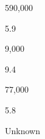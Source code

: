 \begin{description}[font=\normalfont,style=nextline]
\begin{multicols}{2}
\begin{description}[font=\normalfont\itshape,noitemsep]
\item[\nativespeakers] 590,000 
 \item[\region] \regionMexico 
 \end{description}\end{multicols}
\item[\langnameUlwa] 
 \begin{multicols}{2}\begin{description}[font=\normalfont\itshape,noitemsep] 
 \item[] 
 \item[\pbnumberabbr] 5.9 
 \item[\family] \famMisumalpan 
 \item[]
\item[\nativespeakers] 9,000 
 \item[\region] \regionNicaragua\EnumComma\regionHonduras 
 \end{description}\end{multicols}
\item[\langnameUmbuUngu] 
 \begin{multicols}{2}\begin{description}[font=\normalfont\itshape,noitemsep] 
 \item[] 
 \item[\pbnumberabbr] 9.4 
 \item[\family] \famTNG 
 \item[]
\item[\nativespeakers] 77,000 
 \item[\region] \regionPNG 
 \end{description}\end{multicols}
\item[\langnameUpperPyramid] 
 \begin{multicols}{2}\begin{description}[font=\normalfont\itshape,noitemsep] 
 \item[] 
 \item[\pbnumberabbr] 5.8 
 \item[\family] \famTNG 
 \item[]
\item[\nativespeakers] Unknown 
 \item[\region] \regionPapuaProv\ \Brackets{\regionIndonesia} 
 \end{description}\end{multicols}
\item[\langnameUrhobo] 
 \begin{multicols}{2}\begin{description}[font=\normalfont\itshape,noitemsep] 

\end{description}
\end{multicols}
\end{description}
